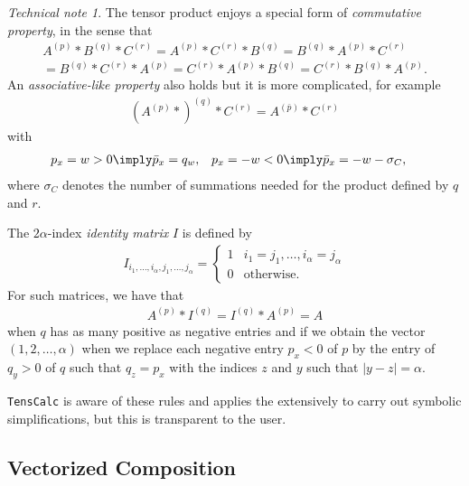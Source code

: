 \documentclass[11pt]{article}
\newcommand{\TC}{\texttt{TensCalc}}
\theoremstyle{remark}
\newtheorem{technical}{Technical note}
\begin{document}
\begin{technical}
  The tensor product enjoys a special form of \emph{commutative
    property}, in the sense that
  \begin{multline*}
    A^{(p)} * B^{(q)} * C^{(r)}
    = A^{(p)} * C^{(r)} * B^{(q)}
    = B^{(q)} * A^{(p)} * C^{(r)}\\
    = B^{(q)} * C^{(r)} * A^{(p)}
    = C^{(r)} * A^{(p)} * B^{(q)}
    = C^{(r)} * B^{(q)} * A^{(p)}.
  \end{multline*}
  An \emph{associative-like property} also holds but it is more
  complicated, for example
  \begin{align*}
    (A^{(p)} *)^{(q)} * C^{(r)}= A^{(\bar p)} * C^{(r)}
  \end{align*}
  with 
  \begin{align*}
    p_x=w>0 &\imply \bar p_x=q_w, &
    p_x=-w<0 &\imply \bar p_x=-w-\sigma_C,
  \end{align*}
  where $\sigma_C$ denotes the number of summations needed for the product
  defined by $q$ and $r$. 

  \medskip

  The $2\alpha$-index \emph{identity matrix} $I$ is defined by
  \begin{align*}
    I_{i_1,\dots,i_\alpha,j_1,\dots,j_\alpha}=
    \begin{cases}
      1 & i_1=j_1,\dots,i_\alpha=j_\alpha\\
      0 & \text{otherwise}.
    \end{cases}
  \end{align*}
  For such matrices, we have that
  \begin{align*}
    A^{(p)} * I^{(q)} = I^{(q)} *  A^{(p)} =A
  \end{align*}
  when $q$ has as many positive as negative entries and if we obtain
  the vector $(1,2,\dots,\alpha)$ when we replace each negative entry $p_x<0$
  of $p$ by the entry of $q_y>0$ of $q$ such that $q_z=p_x$ with the
  indices $z$ and $y$ such that $|y-z|=\alpha$. 

  \medskip

  \TC{} is aware of these rules and applies the extensively to carry
  out symbolic simplifications, but this is transparent to the user.  \frqed
\end{technical}

\subsection{Vectorized Composition}
\end{document}
